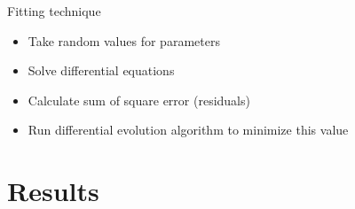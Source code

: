 \documentclass[aspectratio=169,9pt]{beamer}
\begin{document}
    \begin{frame}{Fitting technique}
        \begin{itemize}
            \item Take random values for parameters
            \item Solve differential equations
            \item Calculate sum of square error (residuals)
            \item Run differential evolution algorithm to minimize this value
        \end{itemize}
    \end{frame}

    \section{Results}
\end{document}
